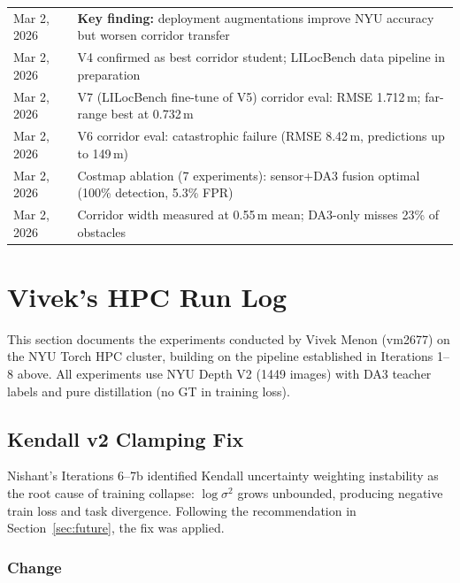\documentclass[11pt,a4paper]{article}
\begin{document}
\begin{longtable}{lp{10cm}}
Mar 2, 2026  & \textbf{Key finding:} deployment augmentations improve NYU accuracy but worsen corridor transfer \\
Mar 2, 2026  & V4 confirmed as best corridor student; LILocBench data pipeline in preparation \\
Mar 2, 2026  & V7 (LILocBench fine-tune of V5) corridor eval: RMSE 1.712\,m; far-range best at 0.732\,m \\
Mar 2, 2026  & V6 corridor eval: catastrophic failure (RMSE 8.42\,m, predictions up to 149\,m) \\
Mar 2, 2026  & Costmap ablation (7 experiments): sensor+DA3 fusion optimal (100\% detection, 5.3\% FPR) \\
Mar 2, 2026  & Corridor width measured at 0.55\,m mean; DA3-only misses 23\% of obstacles \\
\bottomrule
\end{longtable}

\section{Vivek's HPC Run Log}
\label{sec:vivek-hpc}

This section documents the experiments conducted by Vivek Menon (vm2677) on the
NYU Torch HPC cluster, building on the pipeline established in Iterations 1--8
above. All experiments use NYU Depth V2 (1449 images) with DA3 teacher labels
and pure distillation (no GT in training loss).

\subsection{Kendall v2 Clamping Fix}
\label{sec:vivek-kendall}

Nishant's Iterations 6--7b identified Kendall uncertainty weighting instability
as the root cause of training collapse: $\log \sigma^2$ grows unbounded,
producing negative train loss and task divergence. Following the recommendation
in Section~\ref{sec:future}, the fix was applied.

\subsubsection{Change}
\end{document}
